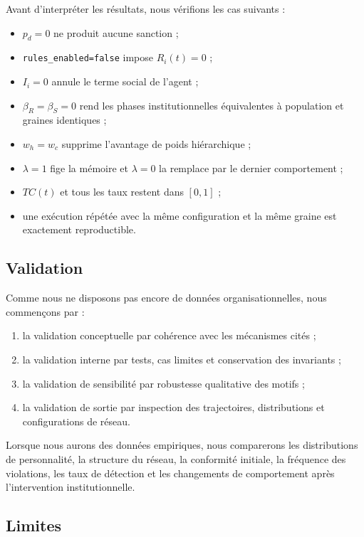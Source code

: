 \documentclass[11pt,a4paper]{article}
\newcommand{\code}[1]{\texttt{\small #1}}
\begin{document}
Avant d’interpréter les résultats, nous vérifions les cas suivants :

\begin{itemize}
  \item $p_d=0$ ne produit aucune sanction ;
  \item \code{rules\_enabled=false} impose $R_i(t)=0$ ;
  \item $I_i=0$ annule le terme social de l’agent ;
  \item $\beta_R=\beta_S=0$ rend les phases institutionnelles équivalentes à
  population et graines identiques ;
  \item $w_h=w_c$ supprime l’avantage de poids hiérarchique ;
  \item $\lambda=1$ fige la mémoire et $\lambda=0$ la remplace par le dernier
  comportement ;
  \item $TC(t)$ et tous les taux restent dans $[0,1]$ ;
  \item une exécution répétée avec la même configuration et la même graine est
  exactement reproductible.
\end{itemize}

\subsection{Validation}

Comme nous ne disposons pas encore de données organisationnelles, nous
commençons par :

\begin{enumerate}
  \item la validation conceptuelle par cohérence avec les mécanismes cités ;
  \item la validation interne par tests, cas limites et conservation des
  invariants ;
  \item la validation de sensibilité par robustesse qualitative des motifs ;
  \item la validation de sortie par inspection des trajectoires, distributions
  et configurations de réseau.
\end{enumerate}

Lorsque nous aurons des données empiriques, nous comparerons les distributions
de personnalité, la structure du réseau, la conformité initiale, la fréquence
des violations, les taux de détection et les changements de comportement après
l’intervention institutionnelle.

\subsection{Limites}
\end{document}
